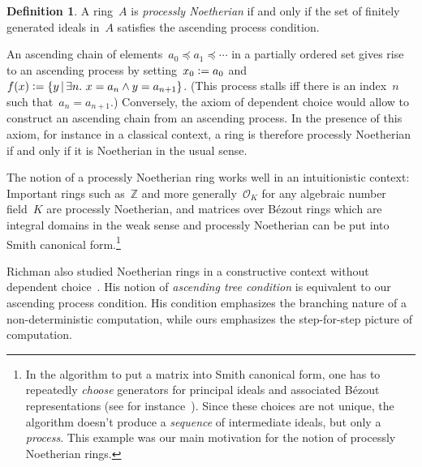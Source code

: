\documentclass[10pt,reqno,a4paper]{amsbook}
\theoremstyle{definition}
\newtheorem{defn}{Definition}[section]
\theoremstyle{plain}
\theoremstyle{remark}
\newcommand{\ZZ}{\mathbb{Z}}
\renewcommand{\O}{\mathcal{O}}
\newcommand{\?}{\,{:}\,}
\renewcommand{\_}{\mathpunct{.}\,}
\newcommand{\defeq}{\vcentcolon=}
\begin{document}
{\begin{defn}A ring~$A$ is \emph{processly Noetherian} if and only if the
set of finitely generated ideals in~$A$ satisfies the ascending process
condition.\end{defn}

An ascending chain of elements~$a_0 \preceq a_1 \preceq \cdots$ in a partially
ordered set gives rise to an ascending process by setting~$x_0 \defeq a_0$
and~$f(x) \defeq \{ y \,|\, \exists n\_ x = a_n \wedge y = a_{n+1} \}$.
(This process stalls iff there is an index~$n$ such that~$a_n = a_{n+1}$.)
Conversely, the axiom of dependent choice would allow to construct an
ascending chain from an ascending process. In the presence of this axiom, for
instance in a classical context, a ring is therefore
processly Noetherian if and only if it is Noetherian in the usual sense.

The notion of a processly Noetherian ring works well in an
intuitionistic context: Important rings such as~$\ZZ$ and more generally~$\O_K$
for any algebraic number field~$K$ are processly Noetherian, and matrices
over Bézout rings which are integral domains in the weak sense and
processly Noetherian can be put into Smith canonical form.\footnote{In the
algorithm to put a matrix into Smith canonical form, one has to repeatedly
\emph{choose} generators for principal ideals and associated Bézout
representations (see for instance~\cite[Section~4]{richman:noetherian}). Since
these choices are not unique, the algorithm doesn't produce a \emph{sequence}
of intermediate ideals, but only a \emph{process}. This example was our main
motivation for the notion of processly Noetherian rings.}

Richman also studied Noetherian rings in a constructive context without
dependent choice~\cite{richman:noetherian}. His notion of \emph{ascending tree
condition} is equivalent to our ascending process condition. His condition
emphasizes the branching nature of a non-deterministic computation, while ours
emphasizes the step-for-step picture of computation.

}
\end{document}
